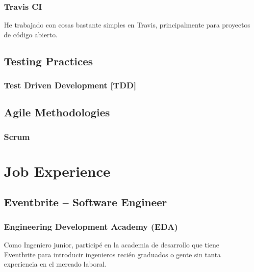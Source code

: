 \documentclass{article}
\begin{document}
\subsubsection{Travis CI}
  \begin{description}
    \item He trabajado con cosas bastante simples en Travis, principalmente para proyectos de código abierto.
  \end{description}
\subsection{Testing Practices}
\subsubsection{Test Driven Development [TDD]}
\subsection{Agile Methodologies}
\subsubsection{Scrum}
\section{Job Experience}
\subsection{Eventbrite – Software Engineer}
\subsubsection{Engineering Development Academy (EDA)}
  \begin{description}
    \item Como Ingeniero junior, participé en la academia de desarrollo que tiene Eventbrite para introducir ingenieros recién graduados o gente sin tanta experiencia en el mercado laboral.
  \end{description}
\end{document}
